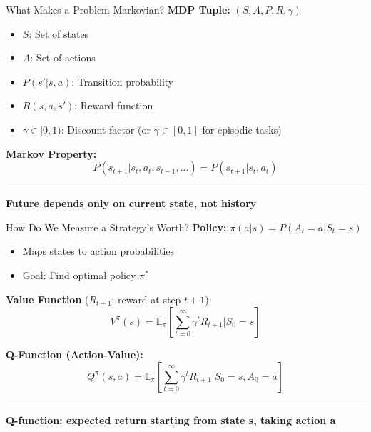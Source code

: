 \documentclass[8pt,aspectratio=169]{beamer}
\newcommand{\bottomnote}[1]{%
\vfill
\vspace{-2mm}
\textcolor{mllavender2}{\rule{\textwidth}{0.4pt}}
\vspace{1mm}
\footnotesize
\textbf{#1}
}
\begin{document}
\begin{frame}[t]{What Makes a Problem Markovian?}
\textbf{MDP Tuple:} $(S, A, P, R, \gamma)$
\begin{itemize}
\item $S$: Set of states
\item $A$: Set of actions
\item $P(s'|s, a)$: Transition probability
\item $R(s, a, s')$: Reward function
\item $\gamma \in [0,1)$: Discount factor (or $\gamma \in [0,1]$ for episodic tasks)
\end{itemize}
\vspace{0.5em}
\textbf{Markov Property:}
\[
P(s_{t+1} | s_t, a_t, s_{t-1}, ...) = P(s_{t+1} | s_t, a_t)
\]
\bottomnote{Future depends only on current state, not history}
\end{frame}

\begin{frame}[t]{How Do We Measure a Strategy's Worth?}
\textbf{Policy:} $\pi(a|s) = P(A_t = a | S_t = s)$
\begin{itemize}
\item Maps states to action probabilities
\item Goal: Find optimal policy $\pi^*$
\end{itemize}
\vspace{0.5em}
\textbf{Value Function} ($R_{t+1}$: reward at step $t{+}1$):
\[
V^\pi(s) = \mathbb{E}_\pi \left[ \sum_{t=0}^{\infty} \gamma^t R_{t+1} | S_0 = s \right]
\]

\textbf{Q-Function (Action-Value):}
\[
Q^\pi(s, a) = \mathbb{E}_\pi \left[ \sum_{t=0}^{\infty} \gamma^t R_{t+1} | S_0 = s, A_0 = a \right]
\]
\bottomnote{Q-function: expected return starting from state s, taking action a}
\end{frame}
\end{document}
